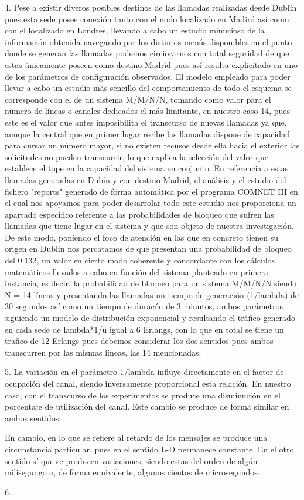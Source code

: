 4.
Pese a existir diveros posibles destinos de las llamadas realizadas desde Dublín pues esta sede posee conexión tanto con el nodo localizado en Madird así como con el localizado en Londres, llevando a cabo un estudio minucioso de la información obtenida navegando por los distintos menús disponibles en el punto donde se generan las llamadas podemos circiorarnos con total seguridad de que estas únicamente poseen como destino Madrid pues así resulta explicitado en uno de los parámetros de configuración observados. El modelo empleado para poder llevar a cabo un estudio más sencillo del comportamiento de todo el esquema se corresponde con el de un sistema M/M/N/N, tomando como valor para el número de líneas o canales dedicados el más limitante, en nuestro caso 14, pues este es el valor que antes imposibilita el transcurso de nuevas llamadas ya que, aunque la central que en primer lugar recibe las llamadas dispone de capacidad para cursar un número mayor, si no existen recusos desde ella hacia el exterior las solicitudes no pueden transcurrir, lo que explica la selección del valor que establece el tope en la capacidad del sistema en conjunto. En referencia a estas llamadas generadas en Dubín y con destino Madrid, el análisis y el estudio del fichero "reports" generado de forma automática por el programa COMNET III en el cual nos apoyamos para poder desarrolar todo este estudio nos proporciona un apartado específico referente a las probabilidades de bloqueo que sufren las llamadas que tiene lugar en el sistema y que son objeto de nuestra investigación. De este modo, poniendo el foco de atención en las que en concreto tienen su origen en Dublin nos percatamos de que presentan una probabilidad de bloqueo del 0.132, un valor en cierto modo coherente y concordante con los cálculos matemáticos llevados a cabo en función del sistema planteado en primera instancia, es decir, la probabilidad de bloqueo para un sistema M/M/N/N siendo N = 14 líneas y presentando las llamadas un tiempo de generación (1/lambda) de 30 segundos así como un tiempo de duracón de 3 minutos, ambos parámetros siguiendo un modelo de distribución exponencial y resultando el tráfico generado en cada sede de lambda*1/u igual a 6 Erlangs, con lo que en total se tiene un trafico de 12 Erlangs pues debemos considerar los dos sentidos pues ambos transcurren por las mismas líneas, las 14 mencionadas.

5.
La variación en el parámetro 1/lambda influye directamente en el factor de ocupación del canal, siendo inversamente proporcional esta relación. En nuestro caso, con el transcurso de los experimentos se produce una disminución en el porcentaje de utilización del canal. Este cambio se produce de forma similar en ambos sentidos.

En cambio, en lo que se refiere al retardo de los mensajes se produce una circunstancia particular, pues en el sentido L-D permanece constante. En el otro sentido sí que se producen variaciones, siendo estas del orden de algún milisegungo o, de forma equivalente, algunos cientos de microsegundos.

6.
